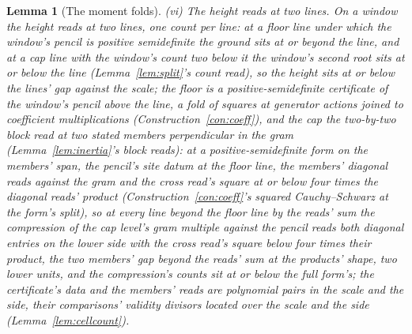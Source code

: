 \documentclass[11pt]{article}
\newtheorem{lemma}{Lemma}
\theoremstyle{definition}
\begin{document}
\begin{lemma}[The moment folds]
\emph{(vi) The height reads at two lines.} On a window the height
reads at two lines, one count per line: at a \emph{floor line} under
which the window's pencil is positive semidefinite the ground sits
at or beyond the line, and at a \emph{cap line} with the window's
count two below it the window's second root sits at or below the
line (Lemma~\ref{lem:split}'s count read), so the height sits at or
below the lines' gap against the scale; the floor is a
positive-semidefinite certificate of the window's pencil above the
line, a fold of squares at generator actions joined to coefficient
multiplications (Construction~\ref{con:coeff}), and the cap the
two-by-two block read at two stated members perpendicular in the
gram (Lemma~\ref{lem:inertia}'s block reads): at a
positive-semidefinite form on the members' span, the pencil's site
datum at the floor line, the members' diagonal reads against the
gram and the cross read's square at or below four times the
diagonal reads' product (Construction~\ref{con:coeff}'s squared
Cauchy--Schwarz at the form's split), so at every line beyond the
floor line by the reads' sum the compression of the cap level's
gram multiple against the pencil reads both diagonal entries on the
lower side with the cross read's square below four times their
product, the two members' gap beyond the reads' sum at the
products' shape, two lower units, and the compression's counts sit
at or below the full form's; the certificate's data and the members' reads are polynomial
pairs in the scale and the side, their comparisons' validity
divisors located over the scale and the side
(Lemma~\ref{lem:cellcount}).
\end{lemma}
\end{document}
